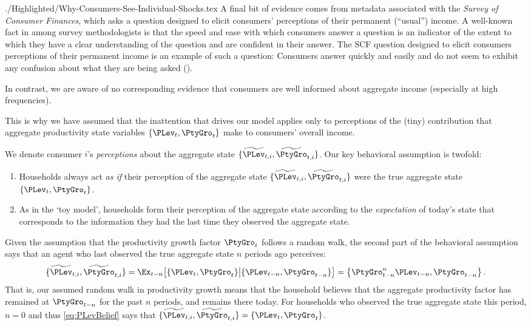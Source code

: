 \documentclass[titlepage]{\econtex}
\begin{document}
\begin{verbatimwrite}{./Highlighted/Why-Consumers-See-Individual-Shocks.tex}
A final bit of evidence comes from metadata associated with the \textit{Survey of Consumer Finances}, which asks a question designed to elicit consumers' perceptions of their permanent (``usual'') income.  A well-known fact in among survey methodologists is that the speed and ease with which consumers answer a question is an indicator of the extent to which they have a clear understanding of the question and are confident in their answer.  The SCF question designed to elicit consumers perceptions of their permanent income is an example of such a question: Consumers answer quickly and easily and do not seem to exhibit any confusion about what they are being asked (\cite{kennickellPermanent}).

In contrast, we are aware of no corresponding evidence that consumers are well informed about aggregate income (especially at high frequencies).%
\end{verbatimwrite}%

This is why we have assumed that the inattention that drives our model applies only to perceptions of the (tiny) contribution that aggregate productivity state variables $\{\PLev_t,\PtyGro_t\}$ make to consumers' overall income.

We denote consumer $i$'s \textit{perceptions} about the aggregate state $\{\perc{\PLev}_{t,i},\perc{\PtyGro}_{t,i}\}$.  Our key behavioral assumption is twofold:
\begin{enumerate}
\item Households always act \textit{as if} their perception of the aggregate state $\{\perc{\PLev}_{t,i},\perc{\PtyGro}_{t,i}\}$ were the true aggregate state $\{\PLev_t,\PtyGro_t\}$.

\item As in the `toy model', households form their perception of the aggregate state according to the \textit{expectation} of today's state that corresponds to the information they had the last time they observed the aggregate state.
\end{enumerate}
Given the assumption that the productivity growth factor $\PtyGro_t$ follows a random walk,
the second part of the behavioral assumption says that an agent who last observed the true
aggregate state $n$ periods ago perceives:
\begin{equation}\label{eq:PLevBelief}
\{\perc{\PLev}_{t,i},\perc{\PtyGro}_{t,i}\} = \Ex_{t-n}\big[\{\PLev_t,\PtyGro_t\} \big| \{\PLev_{t-n},\PtyGro_{t-n}\}\big] = \left\{\PtyGro_{t-n}^{n} \PLev_{t-n},\PtyGro_{t-n}\right\}.
\end{equation}
That is, our assumed random walk in productivity growth means that the household believes that the aggregate productivity factor has remained at $\PtyGro_{t-n}$ for the past $n$ periods, and remains there today. %
For households who observed the true aggregate state this period, $n=0$ and thus \eqref{eq:PLevBelief} says that $\{\perc{\PLev}_{t,i},\perc{\PtyGro}_{t,i}\} = \{\PLev_t,\PtyGro_t\}$.
\end{document}
